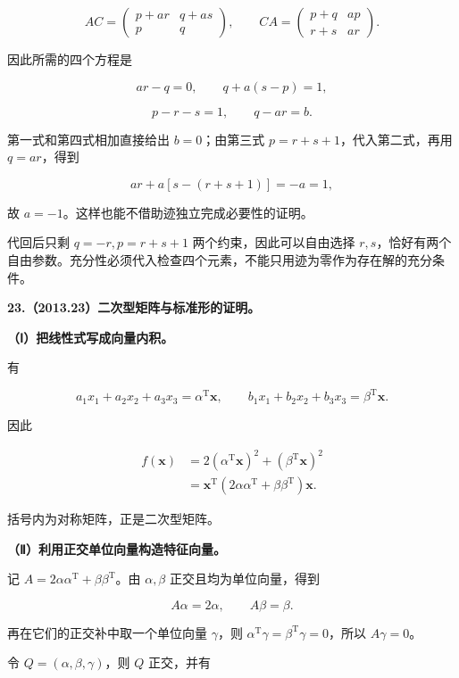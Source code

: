 \documentclass[UTF8,11pt,fontset=windows]{ctexart}
\begin{document}
$$
AC=\begin{pmatrix}p+ar&q+as\\p&q\end{pmatrix},
\qquad
CA=\begin{pmatrix}p+q&ap\\r+s&ar\end{pmatrix}.
$$

因此所需的四个方程是

$$
ar-q=0,\qquad q+a(s-p)=1,
$$

$$
p-r-s=1,\qquad q-ar=b.
$$

第一式和第四式相加直接给出 $b=0$；由第三式 $p=r+s+1$，代入第二式，再用 $q=ar$，得到

$$
ar+a[s-(r+s+1)]=-a=1,
$$

故 $a=-1$。这样也能不借助迹独立完成必要性的证明。

代回后只剩 $q=-r,p=r+s+1$ 两个约束，因此可以自由选择 $r,s$，恰好有两个自由参数。充分性必须代入检查四个元素，不能只用迹为零作为存在解的充分条件。

\clearpage

\textbf{23.（2013.23）二次型矩阵与标准形的证明。}

\textbf{（Ⅰ）把线性式写成向量内积。}

有

$$
a_1x_1+a_2x_2+a_3x_3=\alpha^{\mathrm T}\boldsymbol x,
\qquad
b_1x_1+b_2x_2+b_3x_3=\beta^{\mathrm T}\boldsymbol x.
$$

因此

$$
\begin{aligned}
f(\boldsymbol x)
&=2(\alpha^{\mathrm T}\boldsymbol x)^2+(\beta^{\mathrm T}\boldsymbol x)^2\\
&=\boldsymbol x^{\mathrm T}(2\alpha\alpha^{\mathrm T}+\beta\beta^{\mathrm T})\boldsymbol x.
\end{aligned}
$$

括号内为对称矩阵，正是二次型矩阵。

\textbf{（Ⅱ）利用正交单位向量构造特征向量。}

记 $A=2\alpha\alpha^{\mathrm T}+\beta\beta^{\mathrm T}$。由 $\alpha,\beta$ 正交且均为单位向量，得到

$$
A\alpha=2\alpha,\qquad A\beta=\beta.
$$

再在它们的正交补中取一个单位向量 $\gamma$，则 $\alpha^{\mathrm T}\gamma=\beta^{\mathrm T}\gamma=0$，所以 $A\gamma=0$。

令 $Q=(\alpha,\beta,\gamma)$，则 $Q$ 正交，并有
\end{document}

